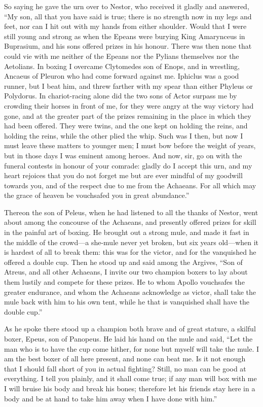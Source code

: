 So saying he gave the urn over to Nestor, who received it gladly and
answered, “My son, all that you have said is true; there is no strength
now in my legs and feet, nor can I hit out with my hands from either
shoulder. Would that I were still young and strong as when the Epeans were
burying King Amarynceus in Buprasium, and his sons offered prizes in his
honour. There was then none that could vie with me neither of the Epeans
nor the Pylians themselves nor the Aetolians. In boxing I overcame
Clytomedes son of Enops, and in wrestling, Ancaeus of Pleuron who had come
forward against me. Iphiclus was a good runner, but I beat him, and threw
farther with my spear than either Phyleus or Polydorus. In chariot-racing
alone did the two sons of Actor surpass me by crowding their horses in
front of me, for they were angry at the way victory had gone, and at the
greater part of the prizes remaining in the place in which they had been
offered. They were twins, and the one kept on holding the reins, and
holding the reins, while the other plied the whip. Such was I then, but
now I must leave these matters to younger men; I must bow before the
weight of years, but in those days I was eminent among heroes. And now,
sir, go on with the funeral contests in honour of your comrade: gladly do
I accept this urn, and my heart rejoices that you do not forget me but are
ever mindful of my goodwill towards you, and of the respect due to me from
the Achaeans. For all which may the grace of heaven be vouchsafed you in
great abundance.”

Thereon the son of Peleus, when he had listened to all the thanks of
Nestor, went about among the concourse of the Achaeans, and presently
offered prizes for skill in the painful art of boxing. He brought out a
strong mule, and made it fast in the middle of the crowd—a she-mule
never yet broken, but six years old—when it is hardest of all to
break them: this was for the victor, and for the vanquished he offered a
double cup. Then he stood up and said among the Argives, “Son of Atreus,
and all other Achaeans, I invite our two champion boxers to lay about them
lustily and compete for these prizes. He to whom Apollo vouchsafes the
greater endurance, and whom the Achaeans acknowledge as victor, shall take
the mule back with him to his own tent, while he that is vanquished shall
have the double cup.”

As he spoke there stood up a champion both brave and of great stature, a
skilful boxer, Epeus, son of Panopeus. He laid his hand on the mule and
said, “Let the man who is to have the cup come hither, for none but myself
will take the mule. I am the best boxer of all here present, and none can
beat me. Is it not enough that I should fall short of you in actual
fighting? Still, no man can be good at everything. I tell you plainly, and
it shall come true; if any man will box with me I will bruise his body and
break his bones; therefore let his friends stay here in a body and be at
hand to take him away when I have done with him.”

